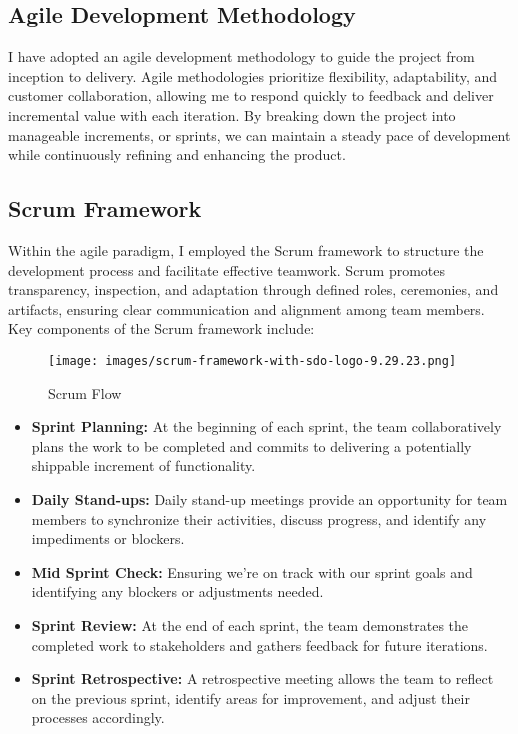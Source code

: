 \documentclass[12pt,a4paper]{report}
\begin{document}
\subsection{Agile Development Methodology}
I have adopted an agile development methodology to guide the project from inception to delivery. Agile methodologies prioritize flexibility, adaptability, and customer collaboration, allowing me to respond quickly to feedback and deliver incremental value with each iteration. By breaking down the project into manageable increments, or sprints, we can maintain a steady pace of development while continuously refining and enhancing the product.

\subsection{Scrum Framework}
Within the agile paradigm, I employed the Scrum framework to structure the development process and facilitate effective teamwork. Scrum promotes transparency, inspection, and adaptation through defined roles, ceremonies, and artifacts, ensuring clear communication and alignment among team members. Key components of the Scrum framework include:

\begin{figure}[h]
  \centering
  \texttt{[image: images/scrum-framework-with-sdo-logo-9.29.23.png]}\\[1.5cm]
  \caption{Scrum Flow}
  \label{fig:example}
\end{figure}



\begin{itemize}
    \item \textbf{Sprint Planning:} At the beginning of each sprint, the team collaboratively plans the work to be completed and commits to delivering a potentially shippable increment of functionality. 
    \item \textbf{Daily Stand-ups:} Daily stand-up meetings provide an opportunity for team members to synchronize their activities, discuss progress, and identify any impediments or blockers. 
    \item \textbf{Mid Sprint Check:} Ensuring we're on track with our sprint goals and identifying any blockers or adjustments needed.
    \item \textbf{Sprint Review:} At the end of each sprint, the team demonstrates the completed work to stakeholders and gathers feedback for future iterations. 
    \item \textbf{Sprint Retrospective:} A retrospective meeting allows the team to reflect on the previous sprint, identify areas for improvement, and adjust their processes accordingly.
\end{itemize}
\end{document}
